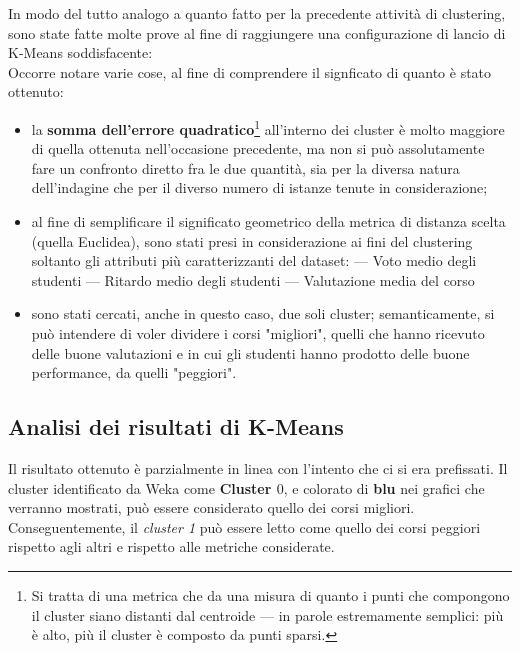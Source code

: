         In modo del tutto analogo a quanto fatto per la precedente attività di clustering, sono state fatte molte prove al fine di raggiungere una configurazione di lancio di K-Means soddisfacente: \\

        

        Occorre notare varie cose, al fine di comprendere il signficato di quanto è stato ottenuto:

        \begin{itemize}
            \item la \textbf{somma dell'errore quadratico}\footnote{Si tratta di una metrica che da una misura di quanto i punti che compongono il cluster siano distanti dal centroide --- in parole estremamente semplici: più è alto, più il cluster è composto da punti sparsi.} all'interno dei cluster è molto maggiore di quella ottenuta nell'occasione precedente, ma non si può assolutamente fare un confronto diretto fra le due quantità, sia per la diversa natura dell'indagine che per il diverso numero di istanze tenute in considerazione;
            \item al fine di semplificare il significato geometrico della metrica di distanza scelta (quella Euclidea), sono stati presi in considerazione ai fini del clustering soltanto gli attributi più caratterizzanti del dataset:
                \subitem --- Voto medio degli studenti
                \subitem --- Ritardo medio degli studenti
                \subitem --- Valutazione media del corso
            \item sono stati cercati, anche in questo caso, due soli cluster; semanticamente, si può intendere di voler dividere i corsi "migliori", quelli che hanno ricevuto delle buone valutazioni e in cui gli studenti hanno prodotto delle buone performance, da quelli "peggiori".
        \end{itemize}

    \subsection{Analisi dei risultati di K-Means}

        Il risultato ottenuto è parzialmente in linea con l'intento che ci si era prefissati. Il cluster identificato da Weka come \textbf{Cluster $0$}, e colorato di \textbf{blu} nei grafici che verranno mostrati, può essere considerato quello dei corsi migliori. Conseguentemente, il \textit{cluster 1} può essere letto come quello dei corsi peggiori rispetto agli altri e rispetto alle metriche considerate. \\

